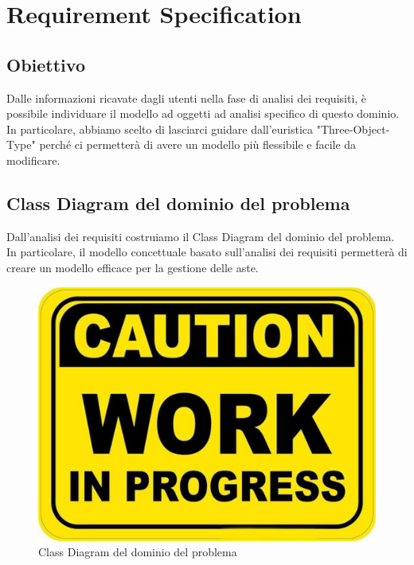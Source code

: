 
\chapter*{Requirement Specification}
    \section{Obiettivo}
        Dalle informazioni ricavate dagli utenti nella fase di analisi dei requisiti, è possibile individuare il modello ad oggetti ad analisi specifico di questo dominio. In particolare, abbiamo scelto di lasciarci guidare dall'euristica "Three-Object-Type" perché ci permetterà di avere un modello più flessibile e facile da modificare.

    \section{Class Diagram del dominio del problema}
        Dall'analisi dei requisiti costruiamo il Class Diagram del dominio del problema.\\
        In particolare, il modello concettuale basato sull'analisi dei requisiti permetterà di creare un modello efficace per la gestione delle aste.\\

        \begin{figure}[htbp!]
            \centering
                \vspace{2\baselineskip}
                \includegraphics[width=\linewidth]{Immagini/WorkInProgress.pdf}
            \caption{Class Diagram del dominio del problema}
            \label{fig:Class Diagram del dominio del problema}
        \end{figure}


